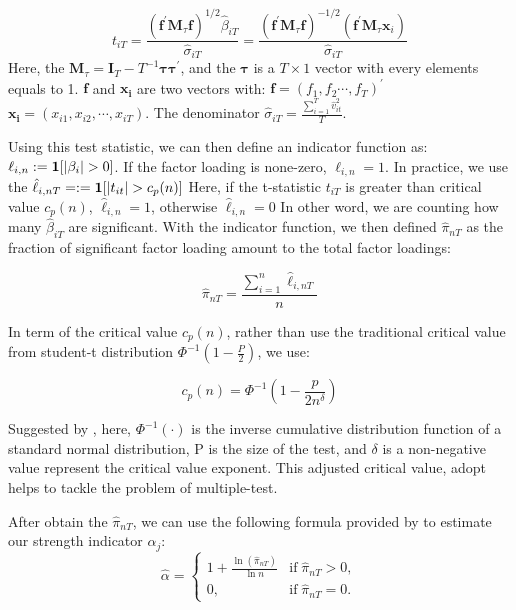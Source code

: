 \documentclass[12pt]{article}
\begin{document}
\[t_{i T}=\frac{\left(\mathbf{f}^{\prime} \mathbf{M}_{\tau} \mathbf{f}\right)^{1 / 2} \hat{\beta}_{i T}}{\hat{\sigma}_{i T}}=\frac{\left(\mathbf{f}^{\prime} \mathbf{M}_{\tau} \mathbf{f}\right)^{-1 / 2}\left(\mathbf{f}^{\prime} \mathbf{M}_{\tau} \mathbf{x}_{i}\right)}{\hat{\sigma}_{i T}} \tag{3} \label{test_statistic} \]
Here, the $\mathbf{M}_{\tau} = \mathbf{I}_T - T^{-1}\mathbf{\tau}\mathbf{\tau^\prime}$, and the $\mathbf{\tau}$ is a $T\times 1$ vector with every elements equals to 1.
$\mathbf{f}$ and $\mathbf{x_i}$ are two vectors with: $\mathbf{f} = (f_1, f_2 \cdots, f_T)^{\prime}$   $\mathbf{x_i} = (x_{i1}, x_{i2}, \cdots, x_{iT})$.
The denominator $\hat{\sigma}_{iT} = \frac{\sum_{i=1}^{T} \hat{v}^2_{it} }{T}$.

Using this test statistic, we can then define an indicator function as: $\ell_{i,n} := {\bf1}[|\beta_i|>0]$.
If the factor loading is none-zero, $\ell_{i,n} = 1$.
In practice, we use the $\hat{\ell}_{i,nT} = := {\bf1}[|t_{it}|>c_p(n)]$
Here, if the t-statistic $t_{iT}$ is greater than critical value $c_p(n)$,  $\hat{\ell}_{i,n} = 1$, otherwise $\hat{\ell}_{i,n} = 0$
In other word, we are counting how many $\hat{\beta}_{iT}$ are significant.
With the indicator function, we then defined $\hat{\pi}_{nT}$ as the fraction of significant factor loading amount to the total factor loadings:

\[  \hat{\pi}_{nT} = \frac{\sum_{i=1}^n \hat{\ell}_{i,nT}}{n} \tag{4} \label{pi_function} \]


In term of the critical value $c_p(n)$, rather than use the traditional critical value from student-t distribution $\Phi^{-1}(1-\frac{P}{2})$, we use:

\[   c_p(n) = \Phi^{-1}(1 - \frac{p}{2n^\delta})   \tag{5} \label{critical_value_function} \]

Suggested by , here, $\Phi^{-1}(\cdot)$ is the inverse cumulative distribution function of a standard normal distribution, P is the size of the test, and $\delta$ is a non-negative value represent the critical value exponent. 
This adjusted critical value, adopt helps to tackle the problem of multiple-test.

After obtain the $\hat{\pi}_{nT}$, we can use the following formula provided by  to estimate our strength indicator $\alpha_j$:
\[ \hat{\alpha} = \begin{cases}
1+\frac{\ln(\hat{\pi}_{nT})}{\ln n} & \text{if}\; \hat{\pi}_{nT} > 0,\\
0, & \text{if}\; \hat{\pi}_{nT} = 0.
\end{cases} \]
\end{document}

